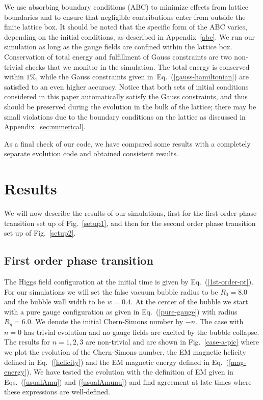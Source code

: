\documentclass[prd,twocolumn,nofootinbib]{revtex4-1}
\begin{document}
We use absorbing boundary conditions (ABC) to minimize effects from lattice 
boundaries and to ensure that negligible contributions enter from outside
the finite lattice box. It should be noted that the specific form of 
the ABC varies, depending on the initial conditions,
as described in Appendix~\ref{abc}. 
We run our simulation as long as the gauge fields are confined within the 
lattice box. 
Conservation of total energy and fulfillment of Gauss constraints are two 
non-trivial checks that we monitor in the simulation. The total energy
is conserved within $1\%$, while the Gauss constraints given 
in~Eq.~(\ref{gauss-hamiltonian}) are satisfied to an even higher accuracy.
Notice that both sets of initial conditions considered in this paper
automatically satisfy the Gauss constraints, and thus should be preserved 
during the evolution in the bulk of the lattice; there may be small violations due
to the boundary conditions on the lattice as discussed in Appendix~\ref{sec:numerical}.

As a final check of our code, we have compared some results with a completely separate evolution code
\cite{Vachaspati:2016abz} and obtained consistent results. 


\section{Results}
\label{sec:results}

We will now describe the results of our simulations, first for the first order phase transition set up
of Fig.~\ref{setup1}, and then for the second order phase transition set up of Fig.~\ref{setup2}.


\subsection{First order phase transition}
\label{firstorder}

The Higgs field configuration at the initial time is given by Eq.~(\ref{1st-order-pt}).
For our simulations we will set the false vacuum bubble radius to be $R_0=8.0$ and the
bubble wall width to be $w=0.4$. At the center of the bubble we start with a pure gauge 
configuration as given in Eq.~(\ref{pure-gauge}) with radius $R_g=6.0$. 
We denote the initial Chern-Simons number by $-n$. The case with $n=0$ 
has trivial evolution and no gauge fields are excited by the bubble collapse. The results for 
$n=1,2,3$ are non-trivial and are shown in Fig.~\ref{case-a-pic} where we plot the evolution
of the Chern-Simons number, the EM magnetic helicity defined in Eq.~(\ref{helicity})
and the EM magnetic energy defined in Eq.~(\ref{mag-energy}). We have tested
the evolution with the definition of EM given in Eqs.~(\ref{usualAmu}) and (\ref{usualAmunu}) 
and find agreement at late times where these expressions are well-defined.
\end{document}

